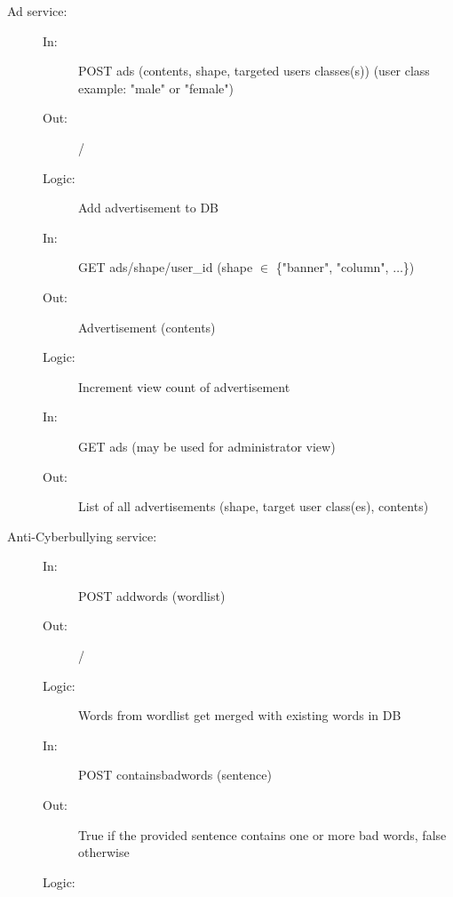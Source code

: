 \documentclass{article}
\begin{document}
\begin{description}
    \item [Ad service:] 
    \begin{description}
        \item[]
        \item[In:] POST ads (contents, shape, targeted users classes(s)) (user class example: "male" or "female")
        \item[Out:] /
        \item[Logic:] Add advertisement to DB
        \item[]
        
        \item[In:] GET ads/shape/user\_id (shape $\in$ \{"banner", "column", $\dots$\})
        \item[Out:] Advertisement (contents)
        \item[Logic:] Increment view count of advertisement
        \item[]
        
		\item[In:] GET ads (may be used for administrator view)
        \item[Out:] List of all advertisements (shape, target user class(es), contents)
    \end{description}
\end{description}

\begin{description}
    \item [Anti-Cyberbullying service:] 
    \begin{description}
        \item[]
        \item[In:] POST addwords (wordlist)
        \item[Out:] /
        \item[Logic:] Words from wordlist get merged with existing words in DB
        \item[]
        
        \item[In:] POST containsbadwords (sentence)
        \item[Out:] True if the provided sentence contains one or more bad words, false otherwise
        \item[Logic:] 
    \end{description}
\end{description}
\end{document}
